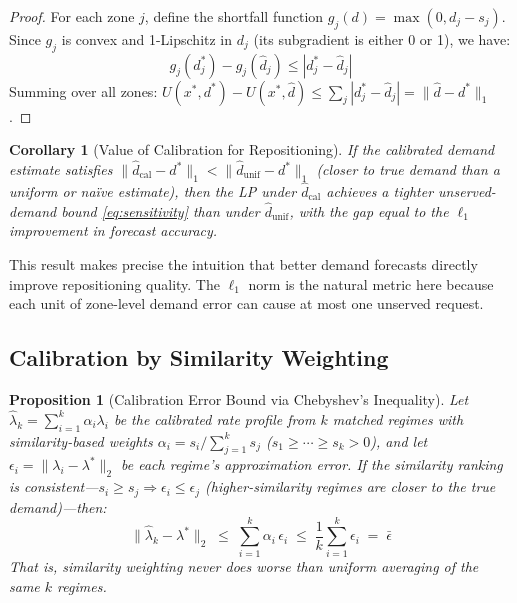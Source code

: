 \documentclass[conference,10pt]{IEEEtran}
\newtheorem{proposition}[theorem]{Proposition}
\newtheorem{corollary}[theorem]{Corollary}
\begin{document}
\begin{proof}
For each zone $j$, define the shortfall function
$g_j(d) = \max(0, d_j - s_j)$. Since $g_j$ is convex and 1-Lipschitz
in $d_j$ (its subgradient is either 0 or 1), we have:
\[
  g_j(d^*_j) - g_j(\hat{d}_j) \leq |d^*_j - \hat{d}_j|
\]
Summing over all zones:
$U(x^*, d^*) - U(x^*, \hat{d}) \leq \sum_j |d^*_j - \hat{d}_j|
= \|\hat{d} - d^*\|_1$.
\end{proof}

\begin{corollary}[Value of Calibration for Repositioning]
\label{cor:calibration_value}
If the calibrated demand estimate satisfies
$\|\hat{d}_\text{cal} - d^*\|_1 < \|\hat{d}_\text{unif} - d^*\|_1$
(closer to true demand than a uniform or na\"ive estimate), then the LP
under $\hat{d}_\text{cal}$ achieves a tighter unserved-demand bound
\eqref{eq:sensitivity} than under $\hat{d}_\text{unif}$, with the
gap equal to the $\ell_1$ improvement in forecast accuracy.
\end{corollary}

This result makes precise the intuition that better demand forecasts
directly improve repositioning quality. The $\ell_1$ norm is the natural
metric here because each unit of zone-level demand error can cause at
most one unserved request.

\subsection{Calibration by Similarity Weighting}

\begin{proposition}[Calibration Error Bound via Chebyshev's Inequality]
\label{prop:calibration_error}
Let $\hat{\lambda}_k = \sum_{i=1}^{k} \alpha_i \lambda_i$ be the
calibrated rate profile from $k$ matched regimes with similarity-based
weights $\alpha_i = s_i / \sum_{j=1}^{k} s_j$
($s_1 \geq \cdots \geq s_k > 0$), and let
$\epsilon_i = \|\lambda_i - \lambda^*\|_2$ be each regime's
approximation error. If the similarity ranking is
\emph{consistent}---$s_i \geq s_j \Rightarrow \epsilon_i \leq \epsilon_j$
(higher-similarity regimes are closer to the true demand)---then:
\begin{equation}
  \|\hat{\lambda}_k - \lambda^*\|_2
  \;\leq\; \sum_{i=1}^{k} \alpha_i\, \epsilon_i
  \;\leq\; \frac{1}{k} \sum_{i=1}^{k} \epsilon_i
  \;=\; \bar{\epsilon}
  \label{eq:calibration_bound}
\end{equation}
That is, similarity weighting never does worse than uniform averaging
of the same $k$ regimes.
\end{proposition}
\end{document}
